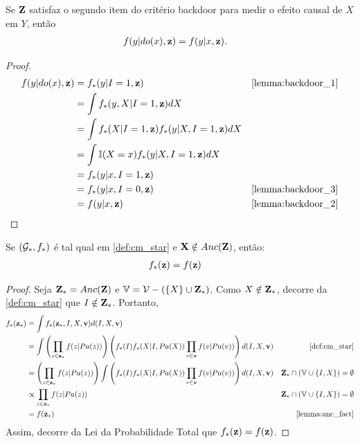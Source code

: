 \begin{lemma}
 \label{thm:backdoor_pt_1}
 Se ${\mathbf{Z}}$ satisfaz 
 o segundo item do critério backdoor para
 medir o efeito causal de $X$ em $Y$, então
 \begin{align*}
  f(y|do(x),{\mathbf{z}}) &= f(y|x,{\mathbf{z}}).
 \end{align*}
\end{lemma}

\begin{proof}
 \begin{align*}
  f(y|do(x),\z)
  &= f_*(y|I=1, \z)
  & \text{\cref{lemma:backdoor_1}} \\
  &= \int f_*(y,X|I=1, \z)dX \\
  &= \int f_*(X|I=1,\z)f_*(y|X, I=1, \z)dX \\
  &= \int \I(X=x)f_*(y|X, I=1, \z)dX \\
  &= f_*(y|x,I=1,\z) \\
  &= f_*(y|x,I=0,\z)
  & \text{\cref{lemma:backdoor_3}} \\
  &= f(y|x,\z)
  & \text{\cref{lemma:backdoor_2}}
 \end{align*}
\end{proof}

\begin{lemma}
 \label{lemma:backdoor_4}
 Se $({\mathcal G}_*, f_*)$ é tal qual em \cref{def:cm_star} e
 ${\mathbf{X}} \notin Anc({\mathbf{Z}})$, então:
 \begin{align*}
  f_*({\mathbf{z}}) &= f({\mathbf{z}})
 \end{align*}
\end{lemma}

\begin{proof}
 Seja ${\mathbf{Z}}_* = Anc({\mathbf{Z}})$ e
 ${\mathbb V} = {\mathcal V} - (\{X\} \cup {\mathbf{Z}}_*)$.
 Como $X \notin {\mathbf{Z}}_*$, decorre 
 da \cref{def:cm_star} que $I \notin {\mathbf{Z}}_*$.
 Portanto,
 \begin{align*}
  f_*(\z_*) 
  &= \int f_*(\z_*, I,X,\bv) d(I,X,\bv) \\
  &= \int \left(\prod_{z \in \z_*} f(z|Pa(z))\right)
  \left(f_*(I)f_*(X|I,Pa(X))
  \prod_{v \in \bv} f(v|Pa(v))\right)d(I,X,\bv)
  & \text{\cref{def:cm_star}} \\
  &= \left(\prod_{z \in \z_*} f(z|Pa(z))\right) 
  \int \left(f_*(I)f_*(X|I,Pa(X)) 
  \prod_{v \in \bv} f(v|Pa(v))\right)d(I,X,\bv) 
  & \Z_* \cap (\V \cup \{I,X\}) = \emptyset \\
  &\propto \prod_{z \in \z_*} f(z|Pa(z)) 
  & \Z_* \cap (\V \cup \{I,X\}) = \emptyset \\
  &= f(\z_*) 
  & \text{\cref{lemma:anc_fact}}
 \end{align*}
 Assim, decorre da Lei da Probabilidade Total que
 $f_*({\mathbf{z}}) = f({\mathbf{z}})$.
\end{proof}

